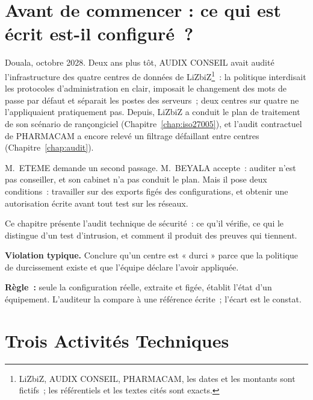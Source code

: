 \bigskip

\section*{Avant de commencer : ce qui est écrit est-il configuré~?}

Douala, octobre 2028. Deux ans plus tôt, AUDIX CONSEIL avait audité
l'infrastructure des quatre centres de données de LiZbiZ\footnote{LiZbiZ,
AUDIX CONSEIL, PHARMACAM, les dates et les montants sont fictifs~; les
référentiels et les textes cités sont exacts.}~: la politique interdisait
les protocoles d'administration en clair, imposait le changement des mots de
passe par défaut et séparait les postes des serveurs~; deux centres sur
quatre ne l'appliquaient pratiquement pas. Depuis, LiZbiZ a conduit le plan
de traitement de son scénario de rançongiciel (Chapitre~\ref{chap:iso27005}),
et l'audit contractuel de PHARMACAM a encore relevé un filtrage défaillant
entre centres (Chapitre~\ref{chap:audit}).

M.~ETEME demande un second passage. M.~BEYALA accepte~: auditer n'est pas
conseiller, et son cabinet n'a pas conduit le plan. Mais il pose deux
conditions~: travailler sur des exports figés des configurations, et
obtenir une autorisation écrite avant tout test sur les réseaux.

\medskip

Ce chapitre présente l'audit technique de sécurité~: ce qu'il vérifie, ce
qui le distingue d'un test d'intrusion, et comment il produit des preuves
qui tiennent.

\begin{boxalert}
\textbf{Violation typique.} Conclure qu'un centre est « durci » parce que
la politique de durcissement existe et que l'équipe déclare l'avoir
appliquée.

\smallskip
\textbf{Règle~:} seule la configuration réelle, extraite et figée, établit
l'état d'un équipement. L'auditeur la compare à une référence écrite~;
l'écart est le constat.
\end{boxalert}

\separateur

\section{Trois Activités Techniques}
\label{sec:c12-activites}


